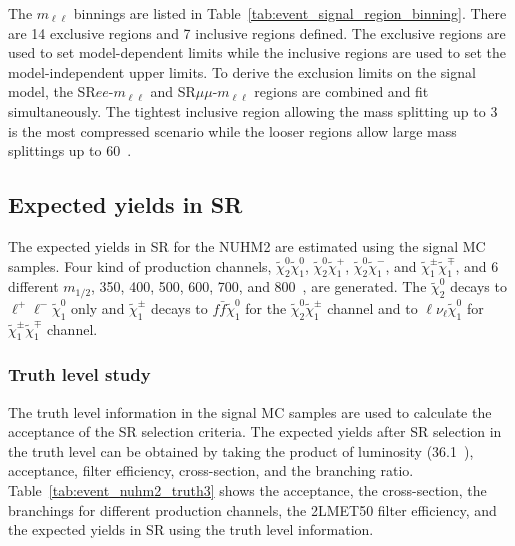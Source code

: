 The $m_{\ell\ell}$ binnings are listed in Table~\ref{tab:event_signal_region_binning}.
There are 14 exclusive regions and 7 inclusive regions defined.
The exclusive regions are used to set model-dependent limits while the inclusive regions are used to set the model-independent upper limits.
To derive the exclusion limits on the signal model, the SR$ee$-$m_{\ell\ell}$ and SR$\mu\mu$-$m_{\ell\ell}$ regions are combined and fit simultaneously.
The tightest inclusive region allowing the mass splitting up to 3~{\GeV} is the most compressed scenario while the looser regions allow large mass splittings up to 60~{\GeV}.


\subsection{Expected yields in SR}
\label{subsec:event_expected_yields_in_SR}
The expected yields in SR for the NUHM2 are estimated using the signal MC samples.
Four kind  of production channels, $\widetilde{\chi}^{0}_{2} \widetilde{\chi}^{0}_{1}$, $\widetilde{\chi}^{0}_{2} \widetilde{\chi}^{+}_{1}$, $\widetilde{\chi}^{0}_{2} \widetilde{\chi}^{-}_{1}$, and $\widetilde{\chi}^{\pm}_{1} \widetilde{\chi}^{\mp}_{1}$, and 6 different $m_{1/2}$, 350, 400, 500, 600, 700, and 800~{\GeV}, are generated.
The $\widetilde{\chi}^{0}_{2}$ decays to $\ell^{+} \ell^{-} \widetilde{\chi}^{0}_{1}$ only and $\widetilde{\chi}^{\pm}_{1}$ decays to $f\bar{f} \widetilde{\chi}^{0}_{1}$ for the $\widetilde{\chi}^{0}_{2} \widetilde{\chi}^{\pm}_{1}$ channel and to $\ell \nu_{\ell} \widetilde{\chi}^{0}_{1}$ for $\widetilde{\chi}^{\pm}_{1} \widetilde{\chi}^{\mp}_{1}$ channel.


\subsubsection{Truth level study}
\label{subsubsec:event_truth_level_study}
The truth level information in the signal MC samples are used to calculate the acceptance of the SR selection criteria.
The expected yields after SR selection in the truth level can be obtained by taking the product of luminosity (36.1~\ifb), acceptance, filter efficiency, cross-section, and the branching ratio.
Table~\ref{tab:event_nuhm2_truth3} shows the acceptance, the cross-section, the branchings for different production channels, the 2LMET50 filter efficiency, and the expected yields in SR using the truth level information.

